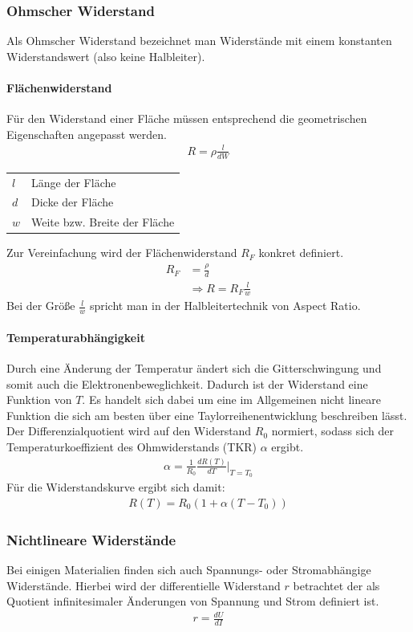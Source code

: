 \documentclass[12pt,a4paper]{article}%
\numberwithin{equation}{section}
\newcommand{\subsubsubsection}{\paragraph}
\begin{document}
\subsubsection{Ohmscher Widerstand}
Als Ohmscher Widerstand bezeichnet man Widerstände mit einem konstanten Widerstandswert (also keine Halbleiter). 
\subsubsubsection{Flächenwiderstand}
Für den Widerstand einer Fläche müssen entsprechend die geometrischen Eigenschaften angepasst werden.
\begin{align}
R = \rho \frac{l}{dW}
\end{align}
\begin{tabular}{p{1cm} p{13.5cm}}
$l$ & Länge der Fläche \\
$d$ & Dicke der Fläche \\
$w$ & Weite bzw. Breite der Fläche\\
\end{tabular} 
\newline
\newline
Zur Vereinfachung wird der Flächenwiderstand $R_F$ konkret definiert.
\begin{align}
R_F &= \frac{\rho}{d} \\
&\Rightarrow R = R_F \frac{l}{w}
\end{align}
Bei der Größe $\frac{l}{w}$ spricht man in der Halbleitertechnik von Aspect Ratio.

\subsubsubsection{Temperaturabhängigkeit}
Durch eine Änderung der Temperatur ändert sich die Gitterschwingung und somit auch die Elektronenbeweglichkeit. Dadurch ist der Widerstand eine Funktion von $T$. Es handelt sich dabei um eine im Allgemeinen nicht lineare Funktion die sich am besten über eine Taylorreihenentwicklung beschreiben lässt. Der Differenzialquotient wird auf den Widerstand $R_0$ normiert, sodass sich der Temperaturkoeffizient des Ohmwiderstands (TKR) $\alpha$ ergibt.
\begin{align}
\alpha = \frac{1}{R_0} \frac{dR(T)}{dT} \Big|_{T=T_0}
\end{align}
Für die Widerstandskurve ergibt sich damit:
\begin{align}
R(T) = R_0 (1+\alpha (T-T_0))
\end{align}
\subsubsection{Nichtlineare Widerstände}
Bei einigen Materialien finden sich auch Spannungs- oder Stromabhängige Widerstände. Hierbei wird der differentielle Widerstand  $r$ betrachtet der als Quotient infinitesimaler Änderungen von Spannung und Strom definiert ist.
\begin{align}
r = \frac{dU}{dI}
\end{align}
\end{document}

